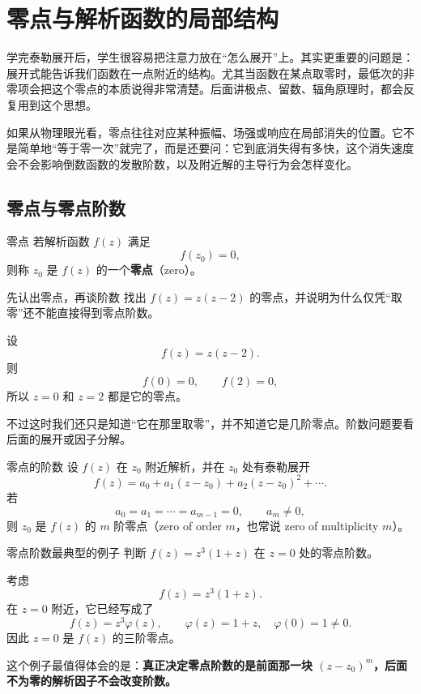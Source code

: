\section{零点与解析函数的局部结构}

\begin{wulibj}[为什么要单独讲零点]
学完泰勒展开后，学生很容易把注意力放在``怎么展开''上。其实更重要的问题是：展开式能告诉我们函数在一点附近的结构。尤其当函数在某点取零时，最低次的非零项会把这个零点的本质说得非常清楚。后面讲极点、留数、辐角原理时，都会反复用到这个思想。
\end{wulibj}

如果从物理眼光看，零点往往对应某种振幅、场强或响应在局部消失的位置。它不是简单地``等于零一次''就完了，而是还要问：它到底消失得有多快，这个消失速度会不会影响倒数函数的发散阶数，以及附近解的主导行为会怎样变化。

\subsection{零点与零点阶数}

\begin{dingliyi}{零点}{}
若解析函数 $f(z)$ 满足
\[
    f(z_0)=0,
\]
则称 $z_0$ 是 $f(z)$ 的一个\textbf{零点}（zero）。
\end{dingliyi}

\begin{lizi}{先认出零点，再谈阶数}{}
找出 $f(z)=z(z-2)$ 的零点，并说明为什么仅凭``取零''还不能直接得到零点阶数。

\begin{jie}
设
\[
    f(z)=z(z-2).
\]
则
\[
    f(0)=0,\qquad f(2)=0,
\]
所以 $z=0$ 和 $z=2$ 都是它的零点。

不过这时我们还只是知道``它在那里取零''，并不知道它是几阶零点。阶数问题要看后面的展开或因子分解。
\end{jie}
\end{lizi}

\begin{dingliyi}{零点的阶数}{}
设 $f(z)$ 在 $z_0$ 附近解析，并在 $z_0$ 处有泰勒展开
\[
    f(z)=a_0+a_1(z-z_0)+a_2(z-z_0)^2+\cdots.
\]
若
\[
    a_0=a_1=\cdots=a_{m-1}=0,\qquad a_m\ne 0,
\]
则 $z_0$ 是 $f(z)$ 的 $m$ 阶零点（zero of order $m$，也常说 zero of multiplicity $m$）。
\end{dingliyi}

\begin{lizi}{零点阶数最典型的例子}{}
判断 $f(z)=z^3(1+z)$ 在 $z=0$ 处的零点阶数。

\begin{jie}
考虑
\[
    f(z)=z^3(1+z).
\]
在 $z=0$ 附近，它已经写成了
\[
    f(z)=z^3\varphi(z),\qquad \varphi(z)=1+z,\quad \varphi(0)=1\ne 0.
\]
因此 $z=0$ 是 $f(z)$ 的三阶零点。

这个例子最值得体会的是：\textbf{真正决定零点阶数的是前面那一块 $(z-z_0)^m$，后面不为零的解析因子不会改变阶数。}
\end{jie}
\end{lizi}

